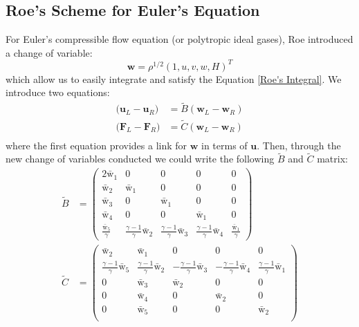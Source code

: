 \documentclass[a4paper]{article}
\numberwithin{equation}{section}
\begin{document}
\subsection{Roe's Scheme for Euler's Equation}
For Euler's compressible flow equation (or polytropic ideal gases), Roe introduced a change of variable:
\begin{equation}
    \mathbf{w} = \rho^{1/2}(1,u,v,w,H)^T
\end{equation}
which allow us to easily integrate and satisfy the Equation \ref{Roe's Integral}. We introduce two equations:
\begin{equation}
    \begin{split}
        \big(\mathbf{u}_L - \mathbf{u}_R\big) &= \tilde{B}(\mathbf{w}_L - \mathbf{w}_R)\\
        \big(\mathbf{F}_L - \mathbf{F}_R\big) &= \tilde{C}(\mathbf{w}_L - \mathbf{w}_R)\\
    \end{split}
\end{equation}
where the first equation provides a link for $\mathbf{w}$ in terms of $\mathbf{u}$. Then, through the new change of variables conducted we could write the following $\tilde{B}$ and $\tilde{C}$ matrix:
\begin{equation}
    \begin{split}
        \tilde{B} &=
        \begin{pmatrix}
            2 \bar{\mathrm{w}}_1 & 0 & 0 & 0 & 0\\
            \bar{\mathrm{w}}_2 & \bar{\mathrm{w}}_1 & 0 & 0 & 0\\
            \bar{\mathrm{w}}_3 & 0 & \bar{\mathrm{w}}_1 & 0 & 0\\
            \bar{\mathrm{w}}_4 & 0 & 0 &\bar{\mathrm{w}}_1 & 0 \\
           \frac{\bar{\mathrm{w}}_5}{\gamma} & \frac{\gamma - 1}{\gamma}\bar{\mathrm{w}}_2 & \frac{\gamma - 1}{\gamma }\bar{\mathrm{w}}_3 & \frac{\gamma - 1}{\gamma} \bar{\mathrm{w}}_4 & \frac{\bar{\mathrm{w}}_1}{\gamma}
        \end{pmatrix} \\
        \tilde{C} &= 
        \begin{pmatrix}
            \bar{\mathrm{w}}_2 & \bar{\mathrm{w}}_1 & 0 & 0 & 0\\
            \frac{\gamma - 1}{\gamma}\bar{\mathrm{w}}_5 & \frac{\gamma - 1}{\gamma}\bar{\mathrm{w}}_2 & -\frac{\gamma - 1}{\gamma}\bar{\mathrm{w}}_3 & -\frac{\gamma - 1}{\gamma} \bar{\mathrm{w}}_4 & \frac{\gamma - 1}{\gamma} \bar{\mathrm{w}}_1\\
            0 & \bar{\mathrm{w}}_3 & \bar{\mathrm{w}}_2 & 0 & 0\\
            0 & \bar{\mathrm{w}}_4 & 0 & \bar{\mathrm{w}}_2 & 0\\
            0 & \bar{\mathrm{w}}_5 & 0 & 0 & \bar{\mathrm{w}}_2\\
        \end{pmatrix}
    \end{split}
\end{equation}
\end{document}
